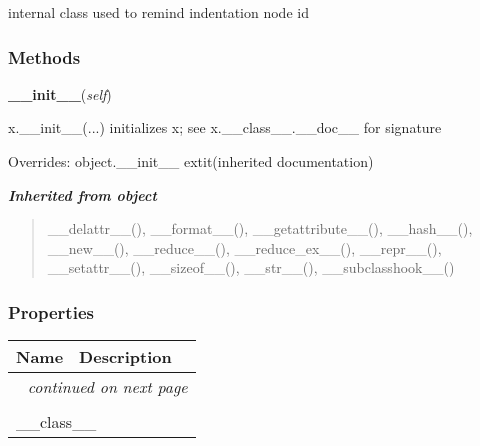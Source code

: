 internal class used to remind indentation node id



  \subsubsection{Methods}

    \vspace{0.5ex}

\hspace{.8\funcindent}\begin{boxedminipage}{\funcwidth}

    \raggedright \textbf{\_\_init\_\_}(\textit{self})

\setlength{\parskip}{2ex}
    x.\_\_init\_\_(...) initializes x; see x.\_\_class\_\_.\_\_doc\_\_ for 
    signature

\setlength{\parskip}{1ex}
      Overrides: object.\_\_init\_\_ 	extit{(inherited documentation)}

    \end{boxedminipage}


\large{\textbf{\textit{Inherited from object}}}

\begin{quote}
\_\_delattr\_\_(), \_\_format\_\_(), \_\_getattribute\_\_(), \_\_hash\_\_(), \_\_new\_\_(), \_\_reduce\_\_(), \_\_reduce\_ex\_\_(), \_\_repr\_\_(), \_\_setattr\_\_(), \_\_sizeof\_\_(), \_\_str\_\_(), \_\_subclasshook\_\_()
\end{quote}


  \subsubsection{Properties}

    \vspace{-1cm}
\hspace{\varindent}\begin{longtable}{|p{\varnamewidth}|p{\vardescrwidth}|l}
\cline{1-2}
\cline{1-2} \centering \textbf{Name} & \centering \textbf{Description}& \\
\cline{1-2}
\endhead\cline{1-2}\multicolumn{3}{r}{\small\textit{continued on next page}}\\\endfoot\cline{1-2}
\endlastfoot\multicolumn{2}{|l|}{\textit{Inherited from object}}\\
\multicolumn{2}{|p{\varwidth}|}{\raggedright \_\_class\_\_}\\
\cline{1-2}
\end{longtable}

